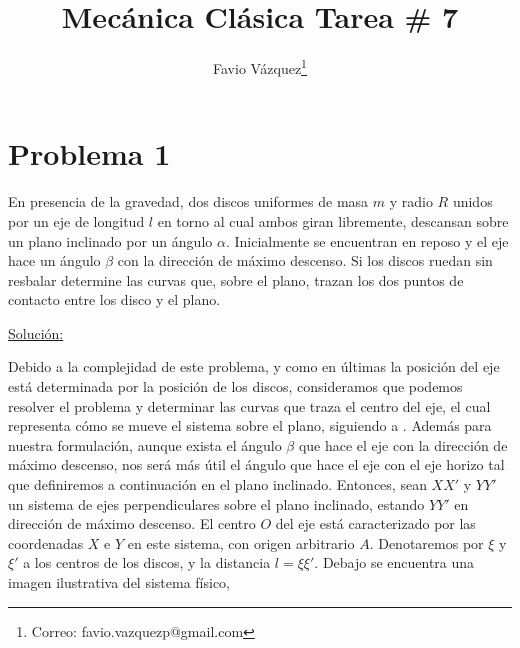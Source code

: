 \documentclass[a4paper,10pt]{article}
\title{Mecánica Clásica Tarea \# 7}
\author{Favio Vázquez\thanks{Correo: favio.vazquezp@gmail.com}}\affil{Instituto de Ciencias Nucleares. Universidad Nacional Autónoma de México.}
\date{}
\numberwithin{equation}{section}
\begin{document}
\makeatletter
\def\@maketitle{%
  \newpage
  \null
  \vskip 2em%
  \begin{center}%
  \let \footnote \thanks
    {\Large\bfseries \@title \par}%
    \vskip 1.5em%
    {\normalsize
      \lineskip .5em%
      \begin{tabular}[t]{c}%
        \@author
      \end{tabular}\par}%
    \vskip 1em%
    {\normalsize \@date}%
  \end{center}%
  \par
  \vskip 1.5em}
\makeatother

\maketitle

\section{Problema 1}

En presencia de la gravedad, dos discos uniformes de masa $m$ y radio $R$ unidos por 
un eje de longitud $l$ en torno al cual ambos giran libremente, descansan sobre un plano 
inclinado por un ángulo $\alpha$. Inicialmente se encuentran en reposo y el eje hace un ángulo 
$\beta$ con la dirección de máximo descenso. Si los discos ruedan sin resbalar determine 
las curvas que, sobre el plano, trazan los dos puntos de contacto entre los disco y el plano.

\vspace{.3cm}

\underline{Solución:} \vspace{.3cm}

Debido a la complejidad de este problema, y como en últimas la posición del eje 
está determinada por la posición de los discos, consideramos que podemos resolver 
el problema y determinar las curvas que traza el centro del eje, el cual representa
cómo se mueve el sistema sobre el plano, siguiendo a . Además para nuestra formulación, aunque 
exista el ángulo $\beta$ que hace el eje con la dirección de máximo descenso, nos será 
más útil el ángulo que hace el eje con el eje horizo tal que definiremos a continuación 
en el plano inclinado. Entonces, sean $XX'$ y $YY'$ un sistema de ejes perpendiculares 
sobre el plano inclinado, estando $YY'$ en dirección de máximo descenso. El centro 
$O$ del eje está caracterizado por las coordenadas $X$ e $Y$ en este sistema, con 
origen arbitrario $A$. Denotaremos por $\xi$ y $\xi'$ a los centros de los discos, y la 
distancia $l=\xi\xi'$. Debajo se encuentra una imagen ilustrativa del sistema físico,
\end{document}
